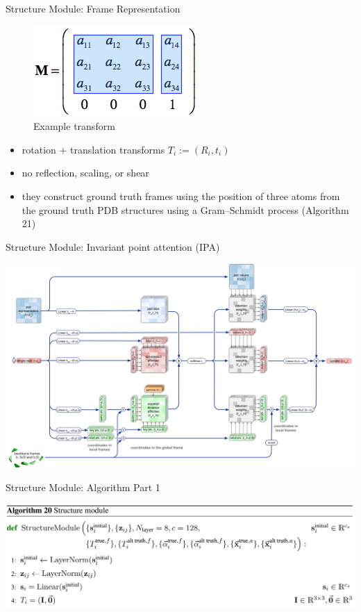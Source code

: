 \documentclass[presentation, smaller]{beamer}
\begin{document}
\begin{frame}[label={sec:org5e09cf4}]{Structure Module: Frame Representation}
\begin{figure}[htbp]
\centering
\includegraphics[scale=0.8]{./imgs/TransformationMatrix1.png}
\caption{Example transform \protect\cite{SpatialTransformationMatrices}}
\end{figure}

\begin{itemize}
\item rotation + translation transforms \(T_i := (R_i,t_i)\)
\item no reflection, scaling, or shear
\item they construct ground truth frames using the position of three atoms from the ground truth PDB structures using a Gram–Schmidt process (Algorithm 21)
\end{itemize}
\end{frame}
\begin{frame}[label={sec:orgad07bee}]{Structure Module: Invariant point attention (IPA) \cite{jumperHighlyAccurateProtein2021}}
\begin{center}
\includegraphics[width=.9\linewidth]{./imgs/ipa.png}
\end{center}
\end{frame}

\begin{frame}[label={sec:orgea8a509}]{Structure Module: Algorithm Part 1 \cite{jumperHighlyAccurateProtein2021}}
\begin{center}
\includegraphics[width=.9\linewidth]{./imgs/algo20-part1.png}
\end{center}
\end{frame}
\end{document}
